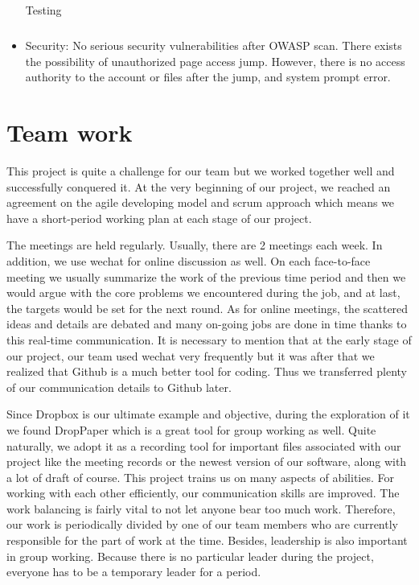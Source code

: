 \documentclass[a4paper,11pt]{article}
\begin{document}
\begin{itemize}
\begin{table}[H]
{\begin{tabular}{|c|p{5cm}|p{5cm}|c|}
\end{tabular}}
\caption{Testing}
\end{table}

\item Security: No serious security vulnerabilities after OWASP scan. There exists the possibility of unauthorized page access jump. However, there is no access authority to the account or files after the jump, and system prompt error.
\end{itemize}

\section{Team work}
This project is quite a challenge for our team but we worked together well and successfully conquered it. At the very beginning of our project, we reached an agreement on the agile developing model and scrum approach which means we have a short-period working plan at each stage of our project.
\par The meetings are held regularly. Usually, there are 2 meetings each week. In addition, we use wechat for online discussion as well. On each face-to-face meeting we usually summarize the work of the previous time period and then we would argue with the core problems we encountered during the job, and at last, the targets would be set for the next round. As for online meetings, the scattered ideas and details are debated and many on-going jobs are done in time thanks to this real-time communication. It is necessary to mention that at the early stage of our project, our team used wechat very frequently but it was after that we realized that Github is a much better tool for coding. Thus we transferred plenty of our communication details to Github later.
\par Since Dropbox is our ultimate example and objective, during the exploration of it we found DropPaper which is a great tool for group working as well. Quite naturally, we adopt it as a recording tool for important files associated with our project like the meeting records or the newest version of our software, along with a lot of draft of course.
This project trains us on many aspects of abilities. For working with each other efficiently, our communication skills are improved. The work balancing is fairly vital to not let anyone bear too much work. Therefore, our work is periodically divided by one of our team members who are currently responsible for the part of work at the time. Besides, leadership is also important in group working. Because there is no particular leader during the project, everyone has to be a temporary leader for a period.  
\end{document}
